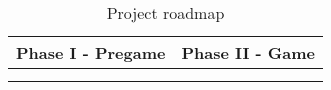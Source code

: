 \begin{table}[htbp!]
	\centering
	\begin{tabular}{ccc|c|c|c|c|c|c|c|c}
		\toprule
		\multicolumn{3}{c}{Phase I - Pregame}   &
		\multicolumn{8}{c}{Phase II - Game}  		\\
		\midrule
		\rotate{week 1}                         &
		\rotate{week 2}                         &
		\rotate{week 3}                         &
		\rotate{week 4}                         &
		\rotate{week 5}                         &
		\rotate{week 6}                         &
		\rotate{week 7}                         &
		\rotate{week 8}                         &
		\rotate{week 9}                         &
		\rotate{week 10}                        &
		\rotate{week 11}                        \\
		\midrule
		\rotate{product definition}     				&
		\rotate{architectural vision} 					&
		\rotate{proposed solution}							&
		\rotate{sprint 1}                       &
		\rotate{sprint 2}                       &
		\rotate{sprint 3}                       &
		\rotate{sprint 4}                       &
		\rotate{sprint 5}                       &
		\rotate{sprint 6}                       &
		\rotate{sprint 7}                       &
		\rotate{sprint 8}                       \\
		\bottomrule
	\end{tabular}
	\caption[Planning]{Project roadmap}
	\label{tab:planning}
\end{table}
